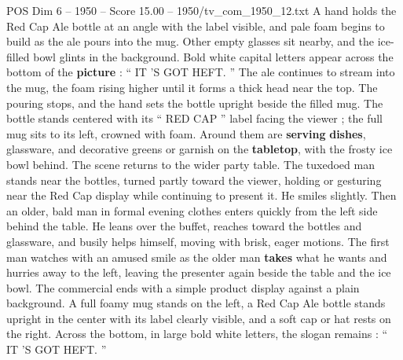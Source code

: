 \begin{textsample}{POS Dim 6 – 1950 – Score 15.00 – 1950/tv\_com\_1950\_12.txt}
A hand holds the Red Cap Ale bottle at an angle with the label visible, and pale foam begins to build as the ale pours into the mug.
Other empty glasses sit nearby, and the ice-filled bowl glints in the background.
Bold white capital letters appear across the bottom of the \textbf{picture} : “ IT ’S GOT HEFT. ” The ale continues to stream into the mug, the foam rising higher until it forms a thick head near the top.
The pouring stops, and the hand sets the bottle upright beside the filled mug.
The bottle stands centered with its “ RED CAP ” label facing the viewer ; the full mug sits to its left, crowned with foam.
Around them are \textbf{serving} \textbf{dishes}, glassware, and decorative greens or garnish on the \textbf{tabletop}, with the frosty ice bowl behind.
The scene returns to the wider party table.
The tuxedoed man stands near the bottles, turned partly toward the viewer, holding or gesturing near the Red Cap display while continuing to present it.
He smiles slightly.
Then an older, bald man in formal evening clothes enters quickly from the left side behind the table.
He leans over the buffet, reaches toward the bottles and glassware, and busily helps himself, moving with brisk, eager motions.
The first man watches with an amused smile as the older man \textbf{takes} what he wants and hurries away to the left, leaving the presenter again beside the table and the ice bowl.
The commercial ends with a simple product display against a plain background.
A full foamy mug stands on the left, a Red Cap Ale bottle stands upright in the center with its label clearly visible, and a soft cap or hat rests on the right.
Across the bottom, in large bold white letters, the slogan remains : “ IT ’S GOT HEFT. ”

\end{textsample}
